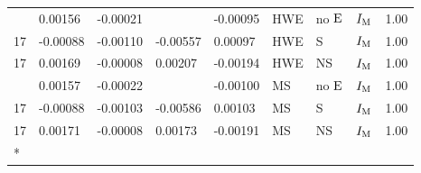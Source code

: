 \begin{longtable}[t]{lllllllll}
\addlinespace
17 & 0.00156 & -0.00021 &  & -0.00095 & HWE & no ${\rm E}$ & $I_{{\rm M}}$ & 1.00\\
17 & -0.00088 & -0.00110 & -0.00557 & 0.00097 & HWE & S & $I_{{\rm M}}$ & 1.00\\
17 & 0.00169 & -0.00008 & 0.00207 & -0.00194 & HWE & NS & $I_{{\rm M}}$ & 1.00\\
\addlinespace
17 & 0.00157 & -0.00022 &  & -0.00100 & MS & no ${\rm E}$ & $I_{{\rm M}}$ & 1.00\\
17 & -0.00088 & -0.00103 & -0.00586 & 0.00103 & MS & S & $I_{{\rm M}}$ & 1.00\\
17 & 0.00171 & -0.00008 & 0.00173 & -0.00191 & MS & NS & $I_{{\rm M}}$ & 1.00\\*
\end{longtable}